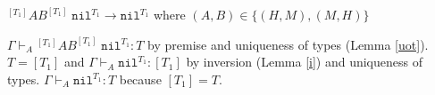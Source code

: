 \begin{case}
$^{[T_{1}]}AB^{[T_{1}]}\;\mathtt{nil}^{T_{1}}\rightarrow\mathtt{nil}^{T_{1}}$ where $(A,B)\in\lbrace(H,M),(M,H)\rbrace$

$\Gamma\vdash_{A}{^{[T_{1}]}A}B^{[T_{1}]}\;\mathtt{nil}^{T_{1}}:T$ by premise and uniqueness of types (Lemma \ref{uot}).  $T=[T_{1}]$ and $\Gamma\vdash_{A}\mathtt{nil}^{T_{1}}:[T_{1}]$ by inversion (Lemma \ref{i}) and uniqueness of types.  $\Gamma\vdash_{A}\mathtt{nil}^{T_{1}}:T$ because $[T_{1}]=T$.
\end{case}